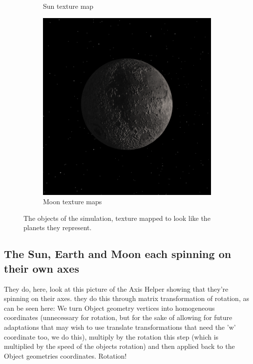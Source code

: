 \documentclass[12pt]{article}
\begin{document}
\begin{figure}[H]
\begin{subfigure}[b]{0.4\textwidth}
                \caption{Sun texture map}
                \label{fig: The Sun texture mapped}
       \end{subfigure}
        \begin{subfigure}[b]{0.4\textwidth}
                \includegraphics[width=\textwidth]{images/moontexture}
                \caption{Moon texture maps}
                \label{fig: The Moon texture mapped}
       \end{subfigure}
       \caption{The objects of the simulation, texture mapped to look like the planets they represent.}\label{fig: Texture mapped Sun, Earth and Moon.}
\end{figure}

\subsection{The Sun, Earth and Moon each spinning on their own axes}
They do, here, look at this picture of the Axis Helper showing that they're spinning on their axes. they do this through matrix transformation of rotation, as can be seen here: We turn Object geometry vertices into homogeneous coordinates (unnecessary for rotation, but for the sake of allowing for future adaptations that may wish to use translate transformations that need the 'w' coordinate too, we do this), multiply by the rotation this step (which is multiplied by the speed of the objects rotation) and then applied back to the Object geometries coordinates. Rotation!
\end{document}
